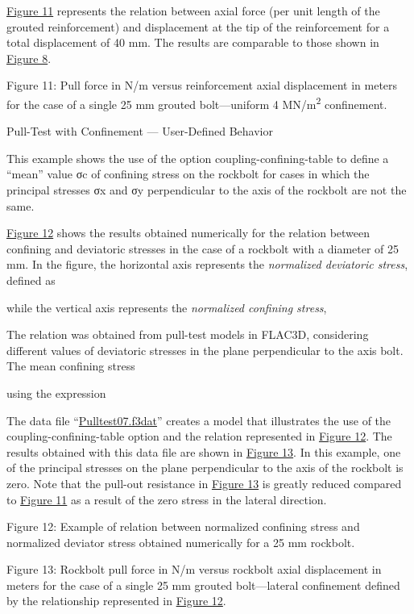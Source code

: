 \documentclass[a4paper, nobind]{templates/ociamthesis}
\begin{document}
\protect\hyperlink{pulltest-pile3}{Figure 11} represents the relation between axial
force (per unit length of the grouted reinforcement) and displacement at
the tip
of the reinforcement for a total displacement of 40 mm. The results are
comparable to those shown in \protect\hyperlink{pulltest-cable3}{Figure 8}.

Figure 11: Pull force in N/m versus reinforcement axial
displacement in meters for the case of a single 25 mm grouted
bolt---uniform 4
MN/m\textsuperscript{2} confinement.

Pull-Test with Confinement --- User-Defined Behavior

This example shows the use of the option coupling-confining-table to
define a ``mean'' value σc of confining stress on the
rockbolt for cases in which the principal stresses σx and σy
perpendicular to the axis of the rockbolt are not the same.

\protect\hyperlink{pulltest-numericalexample}{Figure 12} shows the results obtained
numerically for the relation between confining and deviatoric stresses
in the
case of a rockbolt with a diameter of 25 mm. In the figure, the
horizontal axis
represents the \emph{normalized deviatoric stress}, defined as

while the vertical axis represents the \emph{normalized confining
stress},

The relation was obtained from pull-test models in FLAC3D, considering
different values of deviatoric
stresses in the plane perpendicular to the axis bolt. The mean confining
stress

using the expression

The data file ``\protect\hyperlink{pulltest07data}{Pulltest07.f3dat}'' creates a model that
illustrates the use of the coupling-confining-table
option and the relation represented in \protect\hyperlink{pulltest-numericalexample}{Figure
12}. The results obtained with this
data file are shown in \protect\hyperlink{pulltest-pile4}{Figure 13}. In this example,
one of the principal stresses on the plane perpendicular to the axis of
the
rockbolt is zero. Note that the pull-out resistance in \protect\hyperlink{pulltest-pile4}{Figure
13} is greatly reduced compared to \protect\hyperlink{pulltest-pile3}{Figure
11} as a result of the zero stress in the
lateral direction.

Figure 12: Example of relation between normalized confining
stress and normalized deviator stress obtained numerically for a 25 mm
rockbolt.

Figure 13: Rockbolt pull force in N/m versus rockbolt axial
displacement in meters for the case of a single 25 mm grouted
bolt---lateral
confinement defined by the relationship represented in \protect\hyperlink{pulltest-numericalexample}{Figure
12}.
\end{document}
